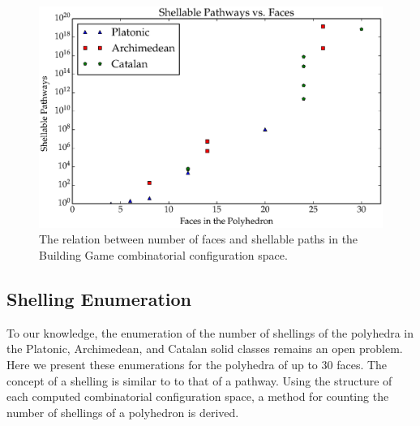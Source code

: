 \begin{figure}[ht]
\includegraphics[scale=0.6, angle=0]{images/polys_face_shell_path.eps}
\caption{The relation between number of faces and shellable paths in the Building Game combinatorial configuration space.}
\label{fig:FacPathShell}
\end{figure}

\subsection{Shelling Enumeration}

To our knowledge, the enumeration of the number of shellings of the polyhedra in the Platonic, Archimedean, and Catalan solid classes remains an open problem. Here we present these enumerations for the polyhedra of up to $30$ faces. The concept of a shelling is similar to to that of a pathway. Using the structure of each computed combinatorial configuration space, a method for counting the number of shellings of a polyhedron is derived. 


